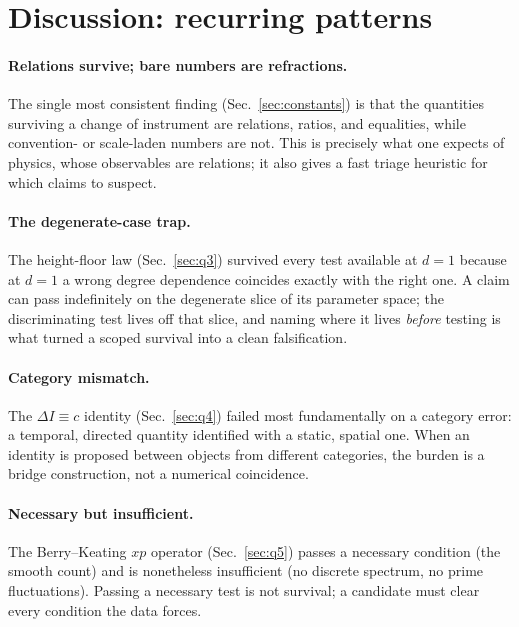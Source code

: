 \documentclass[11pt]{article}
\newcommand{\DI}{\Delta I}
\begin{document}
\section{Discussion: recurring patterns}

\paragraph{Relations survive; bare numbers are refractions.} The single most consistent
finding (Sec.~\ref{sec:constants}) is that the quantities surviving a change of
instrument are relations, ratios, and equalities, while convention- or scale-laden
numbers are not. This is precisely what one expects of physics, whose observables are
relations; it also gives a fast triage heuristic for which claims to suspect.

\paragraph{The degenerate-case trap.} The height-floor law (Sec.~\ref{sec:q3}) survived
every test available at $d=1$ because at $d=1$ a wrong degree dependence coincides
exactly with the right one. A claim can pass indefinitely on the degenerate slice of its
parameter space; the discriminating test lives off that slice, and naming where it lives
\emph{before} testing is what turned a scoped survival into a clean falsification.

\paragraph{Category mismatch.} The $\DI\equiv c$ identity (Sec.~\ref{sec:q4}) failed most
fundamentally on a category error: a temporal, directed quantity identified with a
static, spatial one. When an identity is proposed between objects from different
categories, the burden is a bridge construction, not a numerical coincidence.

\paragraph{Necessary but insufficient.} The Berry--Keating $xp$ operator
(Sec.~\ref{sec:q5}) passes a necessary condition (the smooth count) and is nonetheless
insufficient (no discrete spectrum, no prime fluctuations). Passing a necessary test is
not survival; a candidate must clear every condition the data forces.
\end{document}
